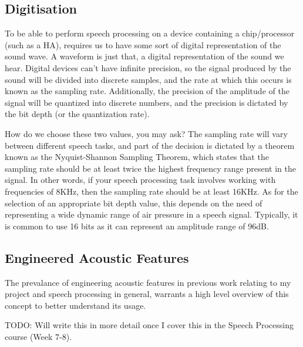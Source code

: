 \documentclass[logo,bsc,singlespacing,parskip,online]{infthesis}
\begin{document}
\subsection{Digitisation}
To be able to perform speech processing on a device containing a chip/processor (such as a HA), requires us 
to have some sort of digital representation of the sound wave. A waveform is just that, a digital representation 
of the sound we hear. Digital devices can't have infinite precision, so the signal produced by the sound will 
be divided into discrete samples, and the rate at which this occurs is known as the sampling rate. Additionally,
the precision of the amplitude of the signal will be quantized into discrete numbers, and the precision is 
dictated by the bit depth (or the quantization rate).

How do we choose these two values, you may ask? The sampling 
rate will vary between different speech tasks, and part of the decision 
is dictated by a theorem known as the Nyquist-Shannon Sampling Theorem, 
which states that the sampling rate should be at least twice the 
highest frequency range present in the signal. In other words, 
if your speech processing task involves working with frequencies 
of 8KHz, then the sampling rate should be at least 16KHz.
As for the selection of an appropriate bit depth value, 
this depends on the need of representing a wide dynamic range 
of air pressure in a speech signal. Typically, it is 
common to use 16 bits as it can represent an amplitude range of 96dB.

\subsection{Engineered Acoustic Features}
The prevalance of engineering acoustic features in previous work relating to my project and speech processing in general,
warrants a high level overview of this concept to better understand its usage. 

TODO: Will write this in more detail once I cover this in the Speech Processing course (Week 7-8).


\end{document}
